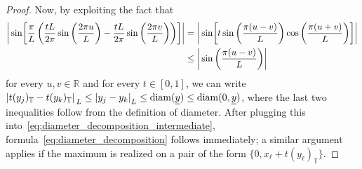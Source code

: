 \documentclass[a4paper, 11pt]{article}
\newcommand{\R}{\mathbb{R}}
\newcommand{\torus}{{\scriptstyle{\mathbb{T}}}}				%
\theoremstyle{thm}
\begin{document}
\begin{proof}
Now, by exploiting the fact that 
\begin{align}
\begin{split}
\abs{ \, \sin \! \left[ \frac{\pi}{L} \left( \frac{tL}{2\pi} \sin \left( \frac{2\pi u}{L} \right) - \frac{tL}{2\pi} \sin \left( \frac{2\pi v}{L} \right) \right) \right] }
& = \abs{ \, \sin \! \left[ t \sin \left( \frac{\pi (u-v)}{L} \right) \cos \left( \frac{\pi (u+v)}{L} \right) \right] } \\
& \le \abs{\, \sin \left( \frac{\pi(u-v)}{L} \right) }
\end{split}
\end{align}
for every $u, v \in \R$ and for every $t \in [0, 1]$, we can write $\abs*{t(y_j)_\torus - t(y_k)_\torus}_L \le \abs{y_j - y_k}_L \le \mathrm{diam}(\underline{y}) \le \mathrm{diam}(0, \underline{y})$, where the last two inequalities follow from the definition of diameter. After plugging this into~\eqref{eq:diameter_decomposition_intermediate}, formula~\eqref{eq:diameter_decomposition} follows immediately; a similar argument applies if the maximum is realized on a pair of the form $\lbrace 0, x_\ell + t (y_\ell)_\torus \rbrace$.


\end{proof}
\end{document}
